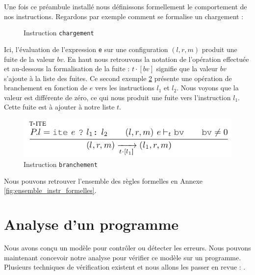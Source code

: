 Une fois ce préambule installé nous définissons formellement le comportement de nos instructions. Regardons par exemple comment se formalise un chargement :

\begin{figure}[!ht]
  \caption{Instruction \texttt{chargement}}
  \label{fig:instr_load}
  \centering
  
\end{figure}

Ici, l'évaluation de l'expression \texttt{e} sur une configuration $(l,r,m)$ produit une fuite de la valeur $bv$. En haut nous retrouvons la notation de l'opération effectuée et au-dessous la formalisation de la fuite : $t \cdot [bv]$ signifie que la valeur $bv$ s'ajoute à la liste des fuites. Ce second exemple \ref{fig:instr_branchement} présente une opération de branchement en fonction de $e$ vers les instructions $l_1$ et $l_2$. Nous voyons que la valeur est différente de zéro, ce qui nous produit une fuite vers l'instruction $l_1$. Cette fuite est à ajouter à notre liste $t$.

\begin{figure}[!ht]
  \caption{Instruction \texttt{branchement}}
  \label{fig:instr_branchement}
  \centering
  \includegraphics[scale = 0.7]{pictures/branchement.png}
\end{figure}

Nous pouvons retrouver l'ensemble des règles formelles en Annexe \ref{fig:ensemble_instr_formelles}.

\section{Analyse d'un programme}

Nous avons conçu un modèle pour contrôler ou détecter les erreurs. Nous pouvons maintenant concevoir notre analyse pour vérifier ce modèle sur un programme. Plusieurs techniques de vérification existent et nous allons les passer en revue : \cite{GeimerEvaluationsSideChannel}.\medbreak


